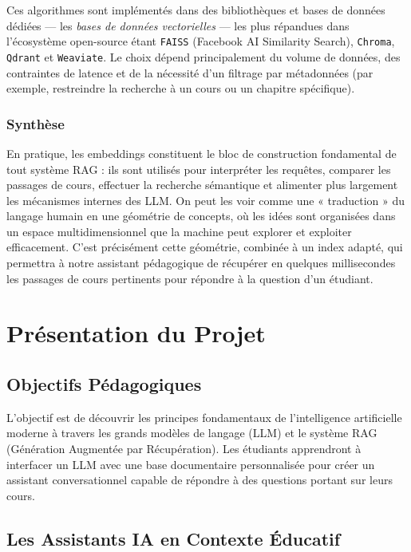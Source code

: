 \documentclass[a4paper,11pt]{article}
\begin{document}
Ces algorithmes sont implémentés dans des bibliothèques et bases de données
dédiées --- les \emph{bases de données vectorielles} --- les plus répandues
dans l'écosystème open-source étant \texttt{FAISS} (Facebook AI Similarity
Search), \texttt{Chroma}, \texttt{Qdrant} et \texttt{Weaviate}. Le choix
dépend principalement du volume de données, des contraintes de latence et de
la nécessité d'un filtrage par métadonnées (par exemple, restreindre la
recherche à un cours ou un chapitre spécifique).

\subsubsection{Synthèse}

En pratique, les embeddings constituent le bloc de construction fondamental
de tout système RAG : ils sont utilisés pour interpréter les requêtes,
comparer les passages de cours, effectuer la recherche sémantique et
alimenter plus largement les mécanismes internes des LLM. On peut les voir
comme une « traduction » du langage humain en une géométrie de concepts, où
les idées sont organisées dans un espace multidimensionnel que la machine
peut explorer et exploiter efficacement. C'est précisément cette géométrie,
combinée à un index adapté, qui permettra à notre assistant pédagogique de
récupérer en quelques millisecondes les passages de cours pertinents pour
répondre à la question d'un étudiant.

\newpage
\section{Présentation du Projet}

\subsection{Objectifs Pédagogiques}
L'objectif est de découvrir les principes fondamentaux de l'intelligence
artificielle moderne à travers les grands modèles de langage (LLM) et le
système RAG (Génération Augmentée par Récupération). Les étudiants apprendront
à interfacer un LLM avec une base documentaire personnalisée pour créer un
assistant conversationnel capable de répondre à des questions portant sur
leurs cours.

\subsection{Les Assistants IA en Contexte Éducatif}
\end{document}

